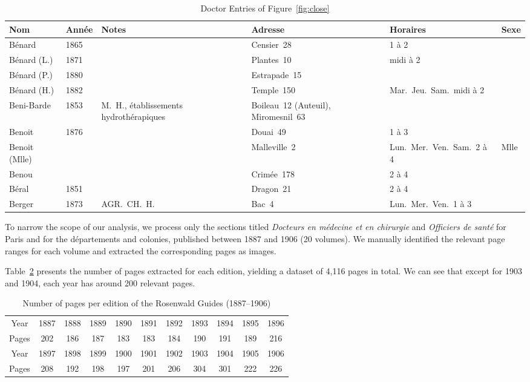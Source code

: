 \begin{table}[htbp]
\centering
\small
\begin{tabular}{llp{3.2cm}p{2.3cm}p{3.5cm}l}
\toprule
\textbf{Nom} & \textbf{Année} & \textbf{Notes} & \textbf{Adresse} & \textbf{Horaires} & \textbf{Sexe} \\
\midrule
Bénard        & 1865 &  & Censier~28 & 1 à 2 &  \\
Bénard (L.)   & 1871 &  & Plantes~10 & midi à 2 &  \\
Bénard (P.)   & 1880 &  & Estrapade~15 &  &  \\
Bénard (H.)   & 1882 &  & Temple~150 & Mar.~Jeu.~Sam.~midi à 2 &  \\
Beni-Barde    & 1853 & M.~H., établissements hydrothérapiques & Boileau~12 (Auteuil), Miromesnil~63 &  &  \\
Benoit        & 1876 &  & Douai~49 & 1 à 3 &  \\
Benoit (Mlle) &  &  & Malleville~2 & Lun.~Mer.~Ven.~Sam.~2 à 4 & Mlle \\
Benou         &  &  & Crimée~178 & 2 à 4 &  \\
Béral         & 1851 &  & Dragon~21 & 2 à 4 &  \\
Berger        & 1873 & AGR.~CH.~H. & Bac~4 & Lun.~Mer.~Ven.~1 à 3 &  \\
\bottomrule
\end{tabular}
\caption{Doctor Entries of Figure~\ref{fig:close}}
\label{tab:medecins_b}
\end{table}


To narrow the scope of our analysis, we process only the sections titled \emph{Docteurs en médecine et en chirurgie} and \emph{Officiers de santé} for Paris and for the départements and colonies,  published between 1887 and 1906 (20 volumes). We manually identified the relevant page ranges for each volume and extracted the corresponding pages as images.

Table~\ref{tab:pages} presents the number of pages extracted for each edition, yielding a dataset of 4,116 pages in total. We can see that except for 1903 and 1904, each year has around 200 relevant pages.


\begin{table}[htbp]
\centering
\caption{Number of pages per edition of the Rosenwald Guides (1887–1906)}
\label{tab:pages}
\begin{tabular}{c c c c c c c c c c c}
\toprule
Year  & 1887 & 1888 & 1889 & 1890 & 1891 & 1892 & 1893 & 1894 & 1895 & 1896 \\
Pages & 202  & 186  & 187  & 183  & 183  & 184  & 190  & 191  & 189  & 216 \\
\midrule
Year  & 1897 & 1898 & 1899 & 1900 & 1901 & 1902 & 1903 & 1904 & 1905 & 1906 \\
Pages & 208  & 192  & 198  & 197  & 201  & 206  & 304  & 301  & 222  & 226 \\ 
\bottomrule
\end{tabular}
\end{table}



